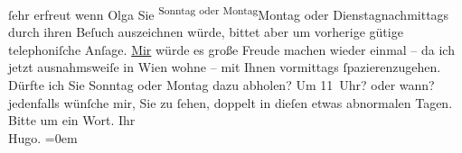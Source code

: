 \begin{ledgroupsized}[t]{13cm}
               ſehr erfreut wenn Olga Sie \substVorne{}\textsuperscript{Sonntag oder Montag}{\allowbreak}\substDazwischen{}Montag oder Dienstag\substHinten{}{ }{\pb}nachmittags durch ihren Beſuch
               auszeichnen würde, bittet aber um vorherige gütige telephoniſche Anſage.\pend
           \pstart
           \uline{Mir} würde es große Freude machen wieder einmal – da
               ich jetzt ausnahmsweiſe in Wien wohne – mit Ihnen
               vormittags ſpazierenzugehen.\pend
           \pstart
           Dürfte ich Sie Sonntag oder Montag dazu abholen? Um
                  11 Uhr? oder wann? jedenfalls wünſche mir, Sie zu ſehen, doppelt in
               dieſen etwas abnormalen Tagen. Bitte um ein Wort.\pend
           \pstart
           Ihr{\\[\baselineskip]}\spacefill\mbox{Hugo.}\pend
           \leftskip=0em{}\endnumbering{}\end{ledgroupsized}  \newcommand{\dateiname}{L01923}\newcommand{\titel}{Hugo von Hofmannsthal an Arthur Schnitzler, 8. 4. 1910}\newcommand{\editorInnen}{Martin Anton Müller und Gerd-Hermann Susen}
      